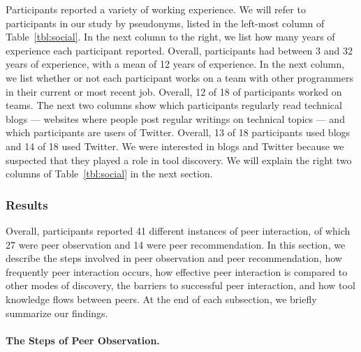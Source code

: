 \documentclass[smallextended]{svjour3}
\newcommand\discovery{peer interaction\xspace}
\newcommand\discpush{peer recommendation\xspace}
\newcommand\discpull{peer observation\xspace}
\newcommand\DiscPull{Peer Observation\xspace}
\begin{document}
\begin{table}[t]
\begin{tabularx}{100mm}{Xr|ccc|cc}
	\end{tabularx}


	
\end{table}
Participants reported a variety of working experience. 
We will refer to participants in our study by pseudonyms, listed in the left-most
column of Table~\ref{tbl:social}.
In the next column to the right, we list how many years of experience each
participant reported. 
Overall, participants had between 3 and 32 years of experience, with 
a mean of 12 years of experience.
In the next column, we list whether or not each participant works on a team with
other programmers in their current or most recent job.
Overall, 12 of 18 of participants worked on teams.
The next two columns show which participants regularly read technical blogs --- 
websites where people post regular writings on technical topics ---   
and which participants are users of Twitter.
Overall, 13 of 18 participants used blogs and 14 of 18 used Twitter. 
We were interested in blogs and Twitter
because we suspected that they played a role in tool discovery.
We will explain the right two columns of Table~\ref{tbl:social} in the next section.

\subsubsection{Results}

\noindent
Overall, participants reported 41 different instances of \discovery,
of which 27 were \discpull and 14 were \discpush.
In this section, we describe 
the steps involved in \discpull and \discpush,
how frequently \discovery occurs,
how effective \discovery is compared to other modes of discovery,
the barriers to successful \discovery,
and how tool knowledge flows between peers.
At the end of each subsection, we briefly summarize our findings.
	
\paragraph{The Steps of \DiscPull.}

\end{document}

